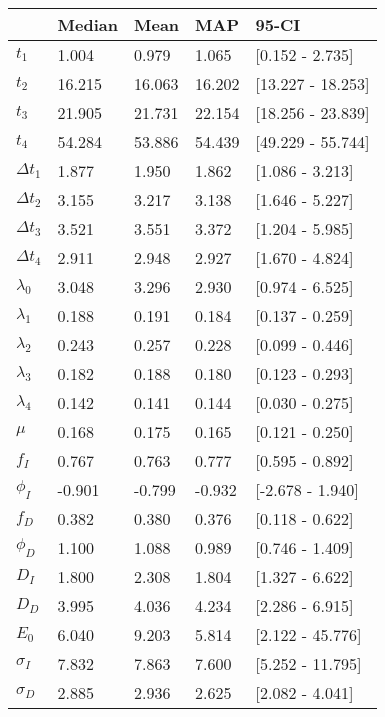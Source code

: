 \begin{tabular}{lllll}
\toprule
{} &  Median &    Mean &     MAP &              95-CI \\
\midrule
$t_1$        &   1.004 &   0.979 &   1.065 &    [0.152 - 2.735] \\
$t_2$        &  16.215 &  16.063 &  16.202 &  [13.227 - 18.253] \\
$t_3$        &  21.905 &  21.731 &  22.154 &  [18.256 - 23.839] \\
$t_4$        &  54.284 &  53.886 &  54.439 &  [49.229 - 55.744] \\
$\Delta t_1$ &   1.877 &   1.950 &   1.862 &    [1.086 - 3.213] \\
$\Delta t_2$ &   3.155 &   3.217 &   3.138 &    [1.646 - 5.227] \\
$\Delta t_3$ &   3.521 &   3.551 &   3.372 &    [1.204 - 5.985] \\
$\Delta t_4$ &   2.911 &   2.948 &   2.927 &    [1.670 - 4.824] \\
$\lambda_0$  &   3.048 &   3.296 &   2.930 &    [0.974 - 6.525] \\
$\lambda_1$  &   0.188 &   0.191 &   0.184 &    [0.137 - 0.259] \\
$\lambda_2$  &   0.243 &   0.257 &   0.228 &    [0.099 - 0.446] \\
$\lambda_3$  &   0.182 &   0.188 &   0.180 &    [0.123 - 0.293] \\
$\lambda_4$  &   0.142 &   0.141 &   0.144 &    [0.030 - 0.275] \\
$\mu$        &   0.168 &   0.175 &   0.165 &    [0.121 - 0.250] \\
$f_I$        &   0.767 &   0.763 &   0.777 &    [0.595 - 0.892] \\
$\phi_I$     &  -0.901 &  -0.799 &  -0.932 &   [-2.678 - 1.940] \\
$f_D$        &   0.382 &   0.380 &   0.376 &    [0.118 - 0.622] \\
$\phi_D$     &   1.100 &   1.088 &   0.989 &    [0.746 - 1.409] \\
$D_I$        &   1.800 &   2.308 &   1.804 &    [1.327 - 6.622] \\
$D_D$        &   3.995 &   4.036 &   4.234 &    [2.286 - 6.915] \\
$E_0$        &   6.040 &   9.203 &   5.814 &   [2.122 - 45.776] \\
$\sigma_I$   &   7.832 &   7.863 &   7.600 &   [5.252 - 11.795] \\
$\sigma_D$   &   2.885 &   2.936 &   2.625 &    [2.082 - 4.041] \\

\end{tabular}
